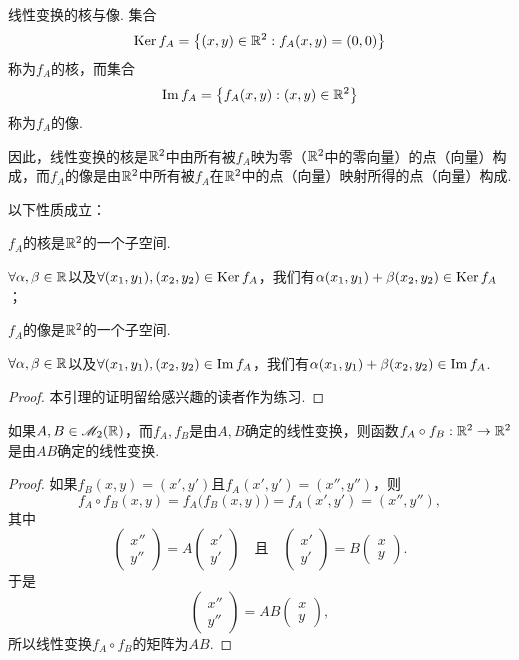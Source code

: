 \begin{definition}
  {\kaishu 线性变换的核与像.} 集合
  \[
    \Ker f_A = \left\{ (x,y)\in\MR^2: f_A(x,y) = (0,0) \right\}
  \]
  称为$f_A$的{\kaishu 核}，而集合
  \[
    \im f_A = \left\{ f_A(x,y):(x,y)\in\MR^2 \right\}
  \]
  称为$f_A$的{\kaishu 像}.
\end{definition}

因此，线性变换的核是$\mathbb R^2$中由所有被$f_A$映为零（$\mathbb R^2$中的零向量）的点（向量）构成，而$f_A$的像是由$\mathbb R^2$中所有被$f_A$在$\mathbb R^2$中的点（向量）映射所得的点（向量）构成.

\begin{lemma}
  以下性质成立：
  \begin{enum}
    \item $f_A$的核是$\mathbb R^2$的一个子空间.

    $\forall\alpha,\beta\in\mathbb R$以及$\forall (x_1,y_1),(x_2,y_2)\in\operatorname{Ker} f_A$，我们有$\alpha(x_1,y_1)+\beta(x_2,y_2)\in\operatorname{Ker} f_A$；
    \item $f_A$的像是$\mathbb R^2$的一个子空间.

    $\forall\alpha,\beta\in\mathbb R$以及$\forall (x_1,y_1),(x_2,y_2)\in\operatorname{Im} f_A$，我们有$\alpha(x_1,y_1)+\beta(x_2,y_2)\in\operatorname{Im} f_A$.
  \end{enum}
\end{lemma}
\begin{proof}
  本引理的证明留给感兴趣的读者作为练习.
\end{proof}

\begin{theorem}
  如果$A,B\in\mathscr M_2(\mathbb R)$，而$f_A,f_B$是由$A,B$确定的线性变换，则函数$f_A\circ f_B:\mathbb R^2\to\mathbb R^2$是由$AB$确定的线性变换.
\end{theorem}
\begin{proof}
  如果$f_B(x,y)=(x',y')$且$f_A(x',y')=(x'',y'')$，则
  \[
    f_A\circ f_B(x,y) = f_A\big( f_B(x,y) \big) = f_A(x',y') = (x'',y''),
  \]
  其中
  \[
    \begin{pmatrix}
      x'' \\
      y''
    \end{pmatrix} = A
    \begin{pmatrix}
      x' \\
      y'
    \end{pmatrix}\quad \text{且}\quad
    \begin{pmatrix}
      x' \\
      y'
    \end{pmatrix} = B
    \begin{pmatrix}
      x \\
      y
    \end{pmatrix}.
  \]
  于是
  \[
    \begin{pmatrix}
      x'' \\
      y''
    \end{pmatrix} =
    AB\begin{pmatrix}
      x \\
      y
    \end{pmatrix},
  \]
  所以线性变换$f_A\circ f_B$的矩阵为$AB$.
\end{proof}

